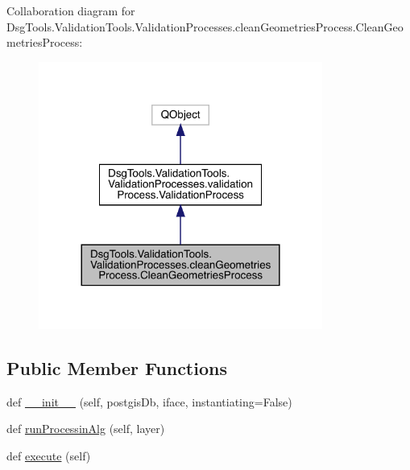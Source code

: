 Collaboration diagram for Dsg\+Tools.\+Validation\+Tools.\+Validation\+Processes.\+clean\+Geometries\+Process.\+Clean\+Geometries\+Process\+:
\nopagebreak
\begin{figure}[H]
\begin{center}
\leavevmode
\includegraphics[width=264pt]{class_dsg_tools_1_1_validation_tools_1_1_validation_processes_1_1clean_geometries_process_1_1_claf28f5e877a98da3f83d4a8d5badfc71}
\end{center}
\end{figure}
\subsection*{Public Member Functions}
\begin{DoxyCompactItemize}
\item 
def \mbox{\hyperlink{class_dsg_tools_1_1_validation_tools_1_1_validation_processes_1_1clean_geometries_process_1_1_clean_geometries_process_a1d98e474a20bb965b5c47466a887cb8f}{\+\_\+\+\_\+init\+\_\+\+\_\+}} (self, postgis\+Db, iface, instantiating=False)
\item 
def \mbox{\hyperlink{class_dsg_tools_1_1_validation_tools_1_1_validation_processes_1_1clean_geometries_process_1_1_clean_geometries_process_aa3aff41e9fe84bf3c3f1fa05691988d0}{run\+Processin\+Alg}} (self, layer)
\item 
def \mbox{\hyperlink{class_dsg_tools_1_1_validation_tools_1_1_validation_processes_1_1clean_geometries_process_1_1_clean_geometries_process_af892430972d064e6793e02a32c82182e}{execute}} (self)
\end{DoxyCompactItemize}

